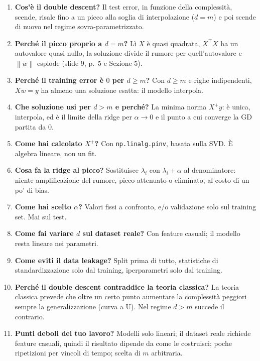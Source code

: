 \documentclass[11pt,a4paper]{article}
\newcommand{\norm}[1]{\left\lVert #1 \right\rVert}
\begin{document}
\begin{enumerate}
  \item \textbf{Cos'è il double descent?} Il test error, in funzione della complessità, scende, risale fino a un picco
        alla soglia di interpolazione ($d=m$) e poi scende di nuovo nel regime sovra-parametrizzato.
  \item \textbf{Perché il picco proprio a $d = m$?} Lì $X$ è quasi quadrata, $X^\top X$ ha un autovalore quasi nullo,
        la soluzione divide il rumore per quell'autovalore e $\norm{w}$ esplode (slide 9, p.~5 e Sezione 5).
  \item \textbf{Perché il training error è $0$ per $d \ge m$?} Con $d \ge m$ e righe indipendenti, $Xw = y$ ha almeno
        una soluzione esatta: il modello interpola.
  \item \textbf{Che soluzione usi per $d > m$ e perché?} La minima norma $X^{+}y$: è unica, interpola, ed è il limite
        della ridge per $\alpha \to 0$ e il punto a cui converge la GD partita da $0$.
  \item \textbf{Come hai calcolato $X^{+}$?} Con \texttt{np.linalg.pinv}, basata sulla SVD. È algebra lineare, non un fit.
  \item \textbf{Cosa fa la ridge al picco?} Sostituisce $\lambda_i$ con $\lambda_i + \alpha$ al denominatore:
        niente amplificazione del rumore, picco attenuato o eliminato, al costo di un po' di bias.
  \item \textbf{Come hai scelto $\alpha$?} Valori fissi a confronto, e/o validazione solo sul training set. Mai sul test.
  \item \textbf{Come fai variare $d$ sul dataset reale?} Con feature casuali; il modello resta lineare nei parametri.
  \item \textbf{Come eviti il data leakage?} Split prima di tutto, statistiche di standardizzazione solo dal training,
        iperparametri solo dal training.
  \item \textbf{Perché il double descent contraddice la teoria classica?} La teoria classica prevede che oltre un certo
        punto aumentare la complessità peggiori sempre la generalizzazione (curva a U). Nel regime $d > m$ succede
        il contrario.
  \item \textbf{Punti deboli del tuo lavoro?} Modelli solo lineari; il dataset reale richiede feature casuali, quindi il
        risultato dipende da come le costruisci; poche ripetizioni per vincoli di tempo; scelta di $m$ arbitraria.
\end{enumerate}
\end{document}
